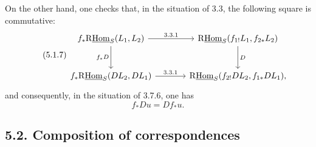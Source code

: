 On the other hand, one checks that, in the situation of 3.3, the following square is commutative:
\begin{equation}
\tag{5.1.7}
\begin{tikzcd}[column sep=large,row sep=large]
f_*\mathrm{R}\underline{\mathrm{Hom}}_S(L_1,L_2) \arrow[r,"3.3.1"] \arrow[d,"f_*D"']
& \mathrm{R}\underline{\mathrm{Hom}}_S(f_{1!}L_1,f_{2*}L_2) \arrow[d,"D"] \\
f_*\mathrm{R}\underline{\mathrm{Hom}}_S(DL_2,DL_1) \arrow[r,"3.3.1"]
& \mathrm{R}\underline{\mathrm{Hom}}_S(f_{2!}DL_2,f_{1*}DL_1),
\end{tikzcd}
\end{equation}
and consequently, in the situation of 3.7.6, one has
\begin{equation}
\tag{5.1.8}
f_*Du=Df_*u.
\end{equation}

\subsection*{5.2. Composition of correspondences}


